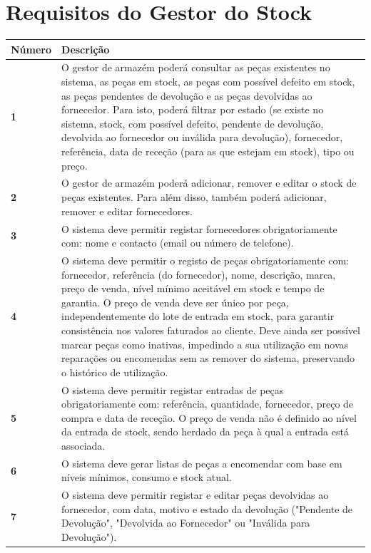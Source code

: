\documentclass[11pt,a4paper]{article}
\begin{document}
	\section*{Requisitos do Gestor do Stock}
	
	\begin{tabularx}{\textwidth}{@{}|l|X|@{}}
		\hline
		\rowcolor{gray!10} \textbf{Número} & \textbf{Descrição} \\ \hline
		\textbf{1} & O gestor de armazém poderá consultar as peças existentes no sistema, as peças em stock, as peças com possível defeito em stock, as peças pendentes de devolução e as peças devolvidas ao fornecedor. Para isto, poderá filtrar por estado (se existe no sistema, stock, com possível defeito, pendente de devolução, devolvida ao fornecedor ou inválida para devolução), fornecedor, referência, data de receção (para as que estejam em stock), tipo ou preço. \\ \hline
		\textbf{2} & O gestor de armazém poderá adicionar, remover e editar o stock de peças existentes. Para além disso, também poderá adicionar, remover e editar fornecedores. \\ \hline
		\textbf{3} & O sistema deve permitir registar fornecedores obrigatoriamente com: nome e contacto (email ou número de telefone). \\ \hline
		\textbf{4} & O sistema deve permitir o registo de peças obrigatoriamente com: fornecedor, referência (do fornecedor), nome, descrição, marca, preço de venda, nível mínimo aceitável em stock e tempo de garantia. O preço de venda deve ser único por peça, independentemente do lote de entrada em stock, para garantir consistência nos valores faturados ao cliente. Deve ainda ser possível marcar peças como inativas, impedindo a sua utilização em novas reparações ou encomendas sem as remover do sistema, preservando o histórico de utilização. \\ \hline
		\textbf{5} & O sistema deve permitir registar entradas de peças obrigatoriamente com: referência, quantidade, fornecedor, preço de compra e data de receção. O preço de venda não é definido ao nível da entrada de stock, sendo herdado da peça à qual a entrada está associada. \\ \hline
		\textbf{6} & O sistema deve gerar listas de peças a encomendar com base em níveis mínimos, consumo e stock atual. \\ \hline
		\textbf{7} & O sistema deve permitir registar e editar peças devolvidas ao fornecedor, com data, motivo e estado da devolução ("Pendente de Devolução", "Devolvida ao Fornecedor" ou "Inválida para Devolução"). \\ \hline

\end{tabularx}
\end{document}

